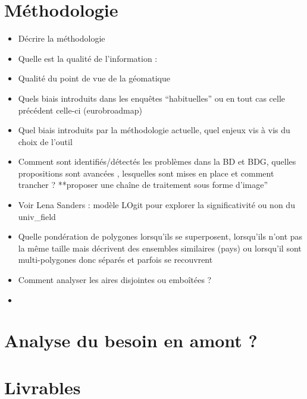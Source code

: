 \documentclass[
  a4paper,
]{scrbook}
\providecommand{\tightlist}{%
  \setlength{\itemsep}{0pt}\setlength{\parskip}{0pt}}\usepackage{longtable,booktabs,array}
\begin{document}
\hypertarget{muxe9thodologie}{%
\section{Méthodologie}\label{muxe9thodologie}}

\begin{itemize}
\tightlist
\item
  Décrire la méthodologie
\item
  Quelle est la qualité de l'information :
\item
  Qualité du point de vue de la géomatique
\item
  Quels biais introduits dans les enquêtes ``habituelles'' ou en tout
  cas celle précédent celle-ci (eurobroadmap)
\item
  Quel biais introduits par la méthodologie actuelle, quel enjeux vis à
  vis du choix de l'outil
\item
  Comment sont identifiés/détectés les problèmes dans la BD et BDG,
  quelles propositions sont avancées , lesquelles sont mises en place et
  comment trancher ? **proposer une chaîne de traitement sous forme
  d'image''
\item
  Voir Lena Sanders : modèle LOgit pour explorer la significativité ou
  non du univ\_field
\item
  Quelle pondération de polygones lorsqu'ils se superposent, lorsqu'ils
  n'ont pas la même taille mais décrivent des ensembles similaires
  (pays) ou lorsqu'il sont multi-polygones donc séparés et parfois se
  recouvrent
\item
  Comment analyser les aires disjointes ou emboîtées ?
\item
\end{itemize}

\hypertarget{analyse-du-besoin-en-amont}{%
\section{Analyse du besoin en amont
?}\label{analyse-du-besoin-en-amont}}

\hypertarget{livrables}{%
\section{Livrables}\label{livrables}}
\end{document}
